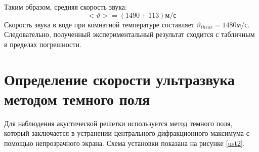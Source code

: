 \documentclass[a4paper,12pt]{article} %
\theoremstyle{plain} %
\theoremstyle{definition} %
\theoremstyle{remark} %
\begin{document}
\begin{enumerate}
Таким образом, средняя скорость звука:
\[ <\vartheta>=(1490 \pm 113) м/с\]
Скорость звука в воде при комнатной температуре составляет $\vartheta_{theor}=1480 м/с$. Следовательно, полученный экспериментальный результат сходится с табличным в пределах погрешности. 
\end{enumerate}

\section{Определение скорости ультразвука методом темного поля}

Для наблюдения акустической решетки используется метод темного поля, который заключается в устранении центрального дифракционного максимума с помощью непрозрачного экрана. Схема установки показана на рисунке \ref{ust2}.
\end{document}
